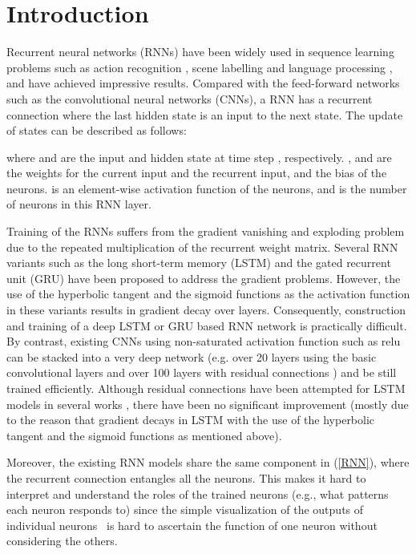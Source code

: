 \documentclass[10pt,twocolumn,letterpaper]{article}
\begin{document}
\section{Introduction}

Recurrent neural networks (RNNs) \cite{jordan1997serial} have been widely used in sequence learning problems such as action recognition \cite{donahue2015long}, scene labelling \cite{byeon2015scene} and language processing \cite{cho2014learning}, and have achieved impressive results. Compared with the feed-forward networks such as the convolutional neural networks (CNNs), a RNN has a recurrent connection where the last hidden state is an input to the next state. The update of states can be described as follows:

where  and  are the input and hidden state at time step , respectively. ,  and  are the weights for the current input and the recurrent input, and the bias of the neurons.  is an element-wise activation function of the neurons, and  is the number of neurons in this RNN layer.

Training of the RNNs suffers from the gradient vanishing and exploding problem due to the repeated multiplication of the recurrent weight matrix. Several RNN variants such as the long short-term memory (LSTM) \cite{greff2017lstm,jozefowicz2015empirical} and the gated recurrent unit (GRU) \cite{cho2014learning} have been proposed to address the gradient problems. However, the use of the hyperbolic tangent and the sigmoid functions as the activation function in these variants results in gradient decay over layers. Consequently, construction and training of a deep LSTM or GRU based RNN network is practically difficult. By contrast, existing CNNs using non-saturated activation function such as relu can be stacked into a very deep network (e.g. over 20 layers using the basic convolutional layers and over 100 layers with residual connections \cite{he2016deep}) and be still trained efficiently. Although residual connections have been attempted for LSTM models in several works \cite{wu2016google,pradhanexploring}, there have been no significant improvement (mostly due to the reason that gradient decays in LSTM with the use of the hyperbolic tangent and the sigmoid functions as mentioned above).

Moreover, the existing RNN models share the same component  in (\ref{RNN}), where the recurrent connection entangles all the neurons. This makes it hard to interpret and understand the roles of the trained neurons (e.g., what patterns each neuron responds to) since the simple visualization of the outputs of individual neurons~\cite{karpathy2015visualizing} is hard to ascertain the function of one neuron without considering the others.
\end{document}
